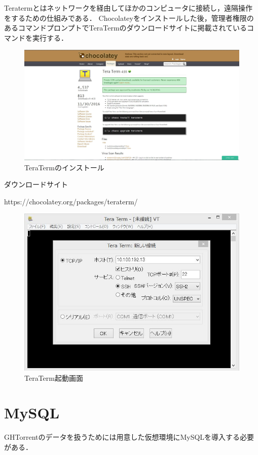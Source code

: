 Teratermとはネットワークを経由してほかのコンピュータに接続し，遠隔操作をするための仕組みである．
Chocolateyをインストールした後，管理者権限のあるコマンドプロンプトでTeraTermのダウンロードサイトに掲載されているコマンドを実行する．

\begin{figure}[htb]
\centering
\includegraphics[width=12cm]{teraterm.JPG}
\caption{TeraTermのインストール}\label{サンプル図}
\end{figure}

ダウンロードサイト

https://chocolatey.org/packages/teraterm/

\begin{figure}[htb]
\centering
\includegraphics[width=12cm]{teraterm2.JPG}
\caption{TeraTerm起動画面}\label{サンプル図}
\end{figure}

\newpage

\section{MySQL}
GHTorrentのデータを扱うためには用意した仮想環境にMySQLを導入する必要がある．

